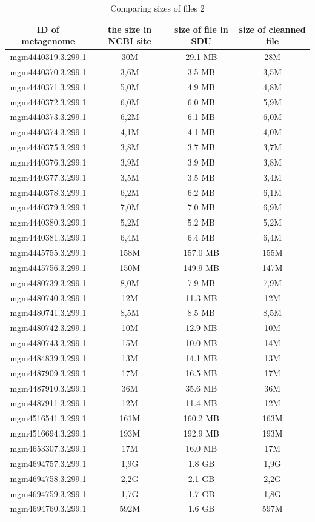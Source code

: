 \documentclass[12pt, a4paper]{report}
\begin{document}
\begin{table}[H]
  \caption{Comparing sizes of files 2}
  \centering
  \begin{tabular}{cccc}
  \hline 
       ID of metagenome&the size in NCBI site&size of file in SDU&size of cleanned file\\
  \hline
	mgm4440319.3.299.1&30M&29.1 MB&28M\\
	mgm4440370.3.299.1&3,6M&3.5 MB&3,5M\\
	mgm4440371.3.299.1&5,0M&4.9 MB&4,8M\\
	mgm4440372.3.299.1&6,0M&6.0 MB&5,9M\\
	mgm4440373.3.299.1&6,2M&6.1 MB&6,0M\\
	mgm4440374.3.299.1&4,1M&4.1 MB&4,0M\\
	mgm4440375.3.299.1&3,8M&3.7 MB&3,7M\\
	mgm4440376.3.299.1&3,9M&3.9 MB&3,8M\\
	mgm4440377.3.299.1&3,5M&3.5 MB&3,4M\\
	mgm4440378.3.299.1&6,2M&6.2 MB&6,1M\\
	mgm4440379.3.299.1&7,0M&7.0 MB&6,9M\\
	mgm4440380.3.299.1&5,2M&5.2 MB&5,2M\\
	mgm4440381.3.299.1&6,4M&6.4 MB&6,4M\\
	mgm4445755.3.299.1&158M&157.0 MB&155M\\
	mgm4445756.3.299.1&150M&149.9 MB&147M\\
	mgm4480739.3.299.1&8,0M&7.9 MB&7,9M\\
	mgm4480740.3.299.1&12M&11.3 MB&12M\\
	mgm4480741.3.299.1&8,5M&8.5 MB&8,5M\\
	mgm4480742.3.299.1&10M&12.9 MB&10M\\
	mgm4480743.3.299.1&15M&10.0 MB&14M\\
	mgm4484839.3.299.1&13M&14.1 MB&13M\\
	mgm4487909.3.299.1&17M&16.5 MB&17M\\
	mgm4487910.3.299.1&36M&35.6 MB&36M\\
	mgm4487911.3.299.1&12M&11.4 MB&12M\\
	mgm4516541.3.299.1&161M&160.2 MB&163M\\
	mgm4516694.3.299.1&193M&192.9 MB&193M\\
	mgm4653307.3.299.1&17M&16.0 MB&17M\\
	mgm4694757.3.299.1&1,9G&1.8 GB&1,9G\\
	mgm4694758.3.299.1&2,2G&2.1 GB&2,2G\\
	mgm4694759.3.299.1&1,7G&1.7 GB&1,8G\\
	mgm4694760.3.299.1&592M&1.6 GB&597M\\
  \hline
  \end{tabular}
  \label{table3}
 \end{table}
\end{document}
